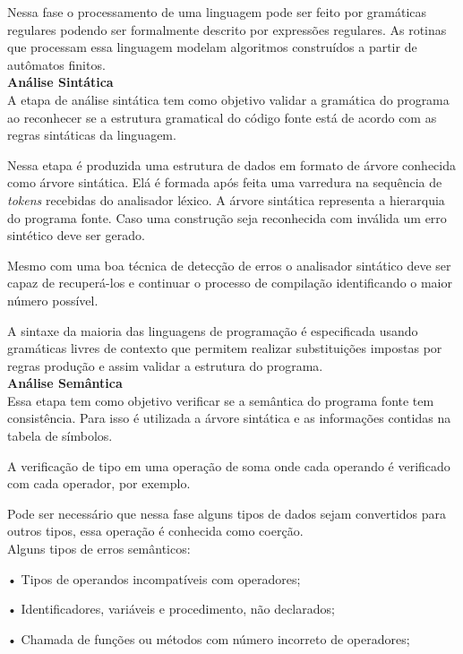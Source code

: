 \documentclass{article}
\begin{document}
Nessa fase o processamento de uma linguagem pode ser feito por gramáticas regulares podendo ser formalmente descrito por expressões regulares. As rotinas que processam essa linguagem modelam algoritmos construídos a partir de autômatos finitos.
\\

\textbf{Análise Sintática}
\\

A etapa de análise sintática tem como objetivo validar a gramática do programa ao reconhecer se a estrutura gramatical do código fonte está de acordo com as regras sintáticas da linguagem.

Nessa etapa é produzida uma estrutura de dados em formato de árvore conhecida como árvore sintática. Elá é formada após feita uma varredura na sequência de \textit{tokens} recebidas do analisador léxico. A árvore sintática representa a hierarquia do programa fonte. Caso uma construção seja reconhecida com inválida um erro sintético deve ser gerado.

Mesmo com uma boa técnica de detecção de erros o analisador sintático deve ser capaz de recuperá-los e continuar o processo de compilação identificando o maior número possível.

A sintaxe da maioria das linguagens de programação é especificada usando gramáticas livres de contexto que permitem realizar substituições impostas por regras produção e assim validar a estrutura do programa.
\\

\textbf{Análise Semântica}
\\

Essa etapa tem como objetivo verificar se a semântica do programa fonte tem consistência. Para isso é utilizada a árvore sintática e as informações contidas na tabela de símbolos.

A verificação de tipo em uma operação de soma onde cada operando é verificado com cada operador, por exemplo.

Pode ser necessário que nessa fase alguns tipos de dados sejam convertidos para outros tipos, essa operação é conhecida como coerção.
\\

Alguns tipos de erros semânticos:

•	Tipos de operandos incompatíveis com operadores;

•	Identificadores, variáveis e procedimento, não declarados;

•	Chamada de funções ou métodos com número incorreto de operadores;
\end{document}

